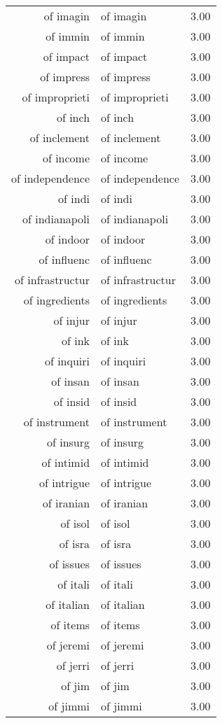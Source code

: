 \begin{table}[ht]
\begin{tabular}{rlr}
  of imagin & of imagin & 3.00 \\ 
  of immin & of immin & 3.00 \\ 
  of impact & of impact & 3.00 \\ 
  of impress & of impress & 3.00 \\ 
  of improprieti & of improprieti & 3.00 \\ 
  of inch & of inch & 3.00 \\ 
  of inclement & of inclement & 3.00 \\ 
  of income & of income & 3.00 \\ 
  of independence & of independence & 3.00 \\ 
  of indi & of indi & 3.00 \\ 
  of indianapoli & of indianapoli & 3.00 \\ 
  of indoor & of indoor & 3.00 \\ 
  of influenc & of influenc & 3.00 \\ 
  of infrastructur & of infrastructur & 3.00 \\ 
  of ingredients & of ingredients & 3.00 \\ 
  of injur & of injur & 3.00 \\ 
  of ink & of ink & 3.00 \\ 
  of inquiri & of inquiri & 3.00 \\ 
  of insan & of insan & 3.00 \\ 
  of insid & of insid & 3.00 \\ 
  of instrument & of instrument & 3.00 \\ 
  of insurg & of insurg & 3.00 \\ 
  of intimid & of intimid & 3.00 \\ 
  of intrigue & of intrigue & 3.00 \\ 
  of iranian & of iranian & 3.00 \\ 
  of isol & of isol & 3.00 \\ 
  of isra & of isra & 3.00 \\ 
  of issues & of issues & 3.00 \\ 
  of itali & of itali & 3.00 \\ 
  of italian & of italian & 3.00 \\ 
  of items & of items & 3.00 \\ 
  of jeremi & of jeremi & 3.00 \\ 
  of jerri & of jerri & 3.00 \\ 
  of jim & of jim & 3.00 \\ 
  of jimmi & of jimmi & 3.00 \\ 

\end{tabular}
\end{table}
